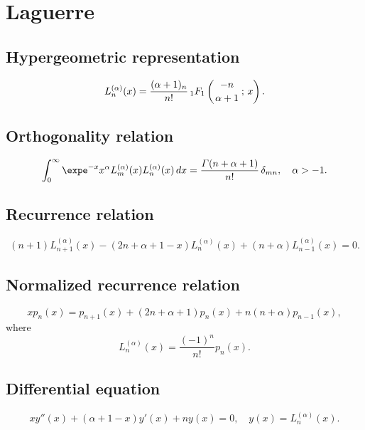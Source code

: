 \documentclass[envcountchap,graybox]{svmono}
\newcommand{\hyp}[5]{\mbox{}_{#1}{F}_{#2}
\left(\genfrac{}{}{0pt}{}{#3}{#4}\,;\,#5\right)}
\renewcommand{\Gamma}{\varGamma}
\begin{document}
\section{Laguerre}

\par\setcounter{equation}{0}

\subsection*{Hypergeometric representation}
\begin{equation}
\label{DefLaguerre}
L_n^{(\alpha)}(x)=\frac{(\alpha+1)_n}{n!}\,\hyp{1}{1}{-n}{\alpha+1}{x}.
\end{equation}

\subsection*{Orthogonality relation}
\begin{equation}
\label{OrtLaguerre}
\int_0^{\infty}\expe^{-x}x^{\alpha}L_m^{(\alpha)}(x)L_n^{(\alpha)}(x)\,dx=
\frac{\Gamma(n+\alpha+1)}{n!}\,\delta_{mn},\quad\alpha > -1.
\end{equation}

\subsection*{Recurrence relation}
\begin{equation}
\label{RecLaguerre}
(n+1)L_{n+1}^{(\alpha)}(x)-(2n+\alpha+1-x)L_n^{(\alpha)}(x)+(n+\alpha)L_{n-1}^{(\alpha)}(x)=0.
\end{equation}

\subsection*{Normalized recurrence relation}
\begin{equation}
\label{NormRecLaguerre}
xp_n(x)=p_{n+1}(x)+(2n+\alpha+1)p_n(x)+n(n+\alpha)p_{n-1}(x),
\end{equation}
where
$$L_n^{(\alpha)}(x)=\frac{(-1)^n}{n!}p_n(x).$$

\subsection*{Differential equation}
\begin{equation}
\label{dvLaguerre}
xy''(x)+(\alpha+1-x)y'(x)+ny(x)=0,\quad y(x)=L_n^{(\alpha)}(x).
\end{equation}
\end{document}
